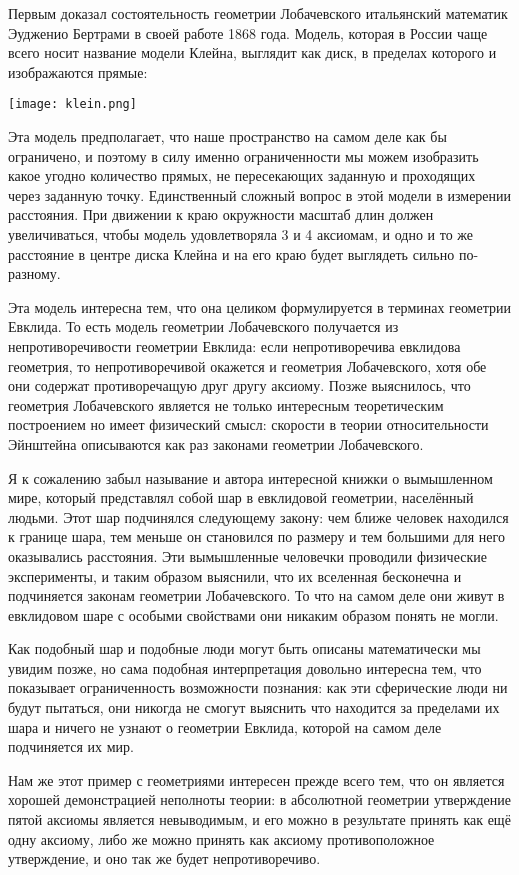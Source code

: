 Первым доказал состоятельность геометрии Лобачевского итальянский математик Эудженио Бертрами в своей работе 1868 года. Модель, которая в России чаще всего носит название модели Клейна, выглядит как диск, в пределах которого и изображаются прямые:

\texttt{[image: klein.png]}

Эта модель предполагает, что наше пространство на самом деле как бы ограничено, и поэтому в силу именно ограниченности мы можем изобразить какое угодно количество прямых, не пересекающих заданную и проходящих через заданную точку. Единственный сложный вопрос в этой модели в измерении расстояния. При движении к краю окружности масштаб длин должен увеличиваться, чтобы модель удовлетворяла 3 и 4 аксиомам, и одно и то же расстояние в центре диска Клейна и на его краю будет выглядеть сильно по-разному.

Эта модель интересна тем, что она целиком формулируется в терминах геометрии Евклида. То есть модель геометрии Лобачевского получается из непротиворечивости геометрии Евклида: если непротиворечива евклидова геометрия, то непротиворечивой окажется и геометрия Лобачевского, хотя обе они содержат противоречащую друг другу аксиому. Позже выяснилось, что геометрия Лобачевского является не только интересным теоретическим построением но имеет физический смысл: скорости в теории относительности Эйнштейна описываются как раз законами геометрии Лобачевского.

Я к сожалению забыл называние и автора интересной книжки о вымышленном мире, который представлял собой шар в евклидовой геометрии, населённый людьми. Этот шар подчинялся следующему закону: чем ближе человек находился к границе шара, тем меньше он становился по размеру и тем большими для него оказывались расстояния. Эти вымышленные человечки проводили физические эксперименты, и таким образом выяснили, что их вселенная бесконечна и подчиняется законам геометрии Лобачевского. То что на самом деле они живут в евклидовом шаре с особыми свойствами они никаким образом понять не могли.

Как подобный шар и подобные люди могут быть описаны математически мы увидим позже, но сама подобная интерпретация довольно интересна тем, что показывает ограниченность возможности познания: как эти сферические люди ни будут пытаться, они никогда не смогут выяснить что находится за пределами их шара и ничего не узнают о геометрии Евклида, которой на самом деле подчиняется их мир.

Нам же этот пример с геометриями интересен прежде всего тем, что он является хорошей демонстрацией неполноты теории: в абсолютной геометрии утверждение пятой аксиомы является невыводимым, и его можно в результате принять как ещё одну аксиому, либо же можно принять как аксиому противоположное утверждение, и оно так же будет непротиворечиво.

